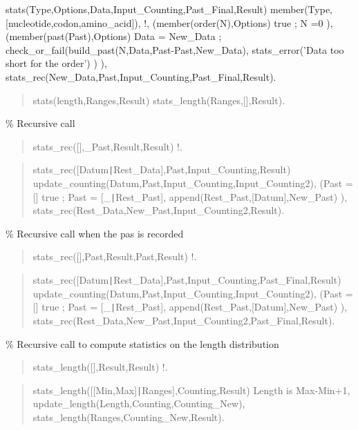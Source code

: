 \begin{center}
stats(Type,Options,Data,Input_Counting,Past_Final,Result) \Sneck{}
member(Type,[nucleotide,codon,amino_acid]),
!,
(member(order(N),Options) \Sifthen{}
true
;
N =0
),
(member(past(Past),Options) \Sifthen{}
Data = New_Data
;
check_or_fail(build_past(N,Data,Past-Past,New_Data),
stats_error('Data too short for the order')
)
),
stats_rec(New_Data,Past,Input_Counting,Past_Final,Result).
\end{center}

\begin{quote}
stats(length,Ranges,Result) \Sneck{}
stats_length(Ranges,[],Result).
\end{quote}

\% Recursive call

\begin{quote}
stats_rec([],_Past,Result,Result) \Sneck{}
!.
\end{quote}

\begin{quote}
stats_rec([Datum{\tt\string|}Rest_Data],Past,Input_Counting,Result) \Sneck{}
update_counting(Datum,Past,Input_Counting,Input_Counting2),
(Past = [] \Sifthen{}
true
;
Past = [_{\tt\string|}Rest_Past],
append(Rest_Past,[Datum],New_Past)
),
stats_rec(Rest_Data,New_Past,Input_Counting2,Result).
\end{quote}

\% Recursive call when the pas is recorded

\begin{quote}
stats_rec([],Past,Result,Past,Result) \Sneck{}
!.
\end{quote}

\begin{quote}
stats_rec([Datum{\tt\string|}Rest_Data],Past,Input_Counting,Past_Final,Result) \Sneck{}
update_counting(Datum,Past,Input_Counting,Input_Counting2),
(Past = [] \Sifthen{}
true
;
Past = [_{\tt\string|}Rest_Past],
append(Rest_Past,[Datum],New_Past)
),
stats_rec(Rest_Data,New_Past,Input_Counting2,Past_Final,Result).
\end{quote}

\% Recursive call to compute statistics on the length distribution

\begin{quote}
stats_length([],Result,Result) \Sneck{}
!.
\end{quote}

\begin{quote}
stats_length([[Min,Max]{\tt\string|}Ranges],Counting,Result) \Sneck{}
Length is Max-Min+1,
update_length(Length,Counting,Counting_New),
stats_length(Ranges,Counting_New,Result).
\end{quote}

